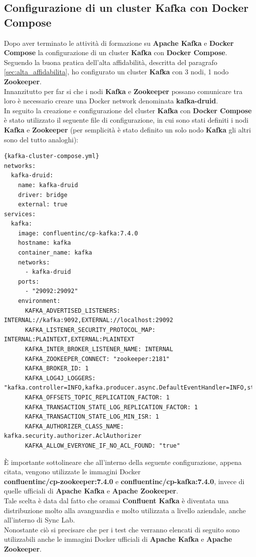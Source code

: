 \subsection{Configurazione di un cluster Kafka con Docker Compose}
Dopo aver terminato le attività di formazione su \textbf{Apache Kafka} e \textbf{Docker Compose} 
la configurazione di un \gls{cluster}{} \textbf{Kafka} con \textbf{Docker Compose}. 
\\Seguendo la buona pratica dell'alta affidabilità, descritta del 
paragrafo \ref{sec:alta_affidabilita}, ho configurato un \gls{cluster}{} \textbf{Kafka} con 3 nodi, 1 nodo \textbf{Zookeeper}.\\
Innanzitutto per far si che i nodi \textbf{Kafka} e \textbf{Zookeeper} possano comunicare tra loro è necessario creare una 
\gls{Docker network}{} denominata \textbf{kafka-druid}.\\
In seguito la creazione e configurazione del \gls{cluster}{} \textbf{Kafka} con \textbf{Docker Compose} è stato utilizzato il seguente file di 
configurazione, in cui sono stati definiti i nodi \textbf{Kafka} e \textbf{Zookeeper} (per semplicità è stato definito un solo nodo \textbf{Kafka} gli altri sono del tutto analoghi):
\begin{lstlisting}[caption=\texttt{kafka-cluster-compose.yml}, label=lst:file]{kafka-cluster-compose.yml}
networks:
  kafka-druid:
    name: kafka-druid
    driver: bridge
    external: true
services:
  kafka:
    image: confluentinc/cp-kafka:7.4.0
    hostname: kafka
    container_name: kafka
    networks:
      - kafka-druid
    ports:
      - "29092:29092"
    environment:
      KAFKA_ADVERTISED_LISTENERS: INTERNAL://kafka:9092,EXTERNAL://localhost:29092
      KAFKA_LISTENER_SECURITY_PROTOCOL_MAP: INTERNAL:PLAINTEXT,EXTERNAL:PLAINTEXT
      KAFKA_INTER_BROKER_LISTENER_NAME: INTERNAL
      KAFKA_ZOOKEEPER_CONNECT: "zookeeper:2181"
      KAFKA_BROKER_ID: 1
      KAFKA_LOG4J_LOGGERS: "kafka.controller=INFO,kafka.producer.async.DefaultEventHandler=INFO,state.change.logger=INFO"
      KAFKA_OFFSETS_TOPIC_REPLICATION_FACTOR: 1
      KAFKA_TRANSACTION_STATE_LOG_REPLICATION_FACTOR: 1
      KAFKA_TRANSACTION_STATE_LOG_MIN_ISR: 1
      KAFKA_AUTHORIZER_CLASS_NAME: kafka.security.authorizer.AclAuthorizer
      KAFKA_ALLOW_EVERYONE_IF_NO_ACL_FOUND: "true"

\end{lstlisting}
È importante sottolineare che all'interno della seguente configurazione, appena citata, vengono utilizzate le \gls{immagini Docker}{} \\\textbf{confluentinc/cp-zookeeper:7.4.0} e \textbf{confluentinc/cp-kafka:7.4.0}, invece 
di quelle ufficiali di \textbf{Apache Kafka} e \textbf{Apache Zookeeper}.\\
Tale scelta è data dal fatto che oramai \textbf{Confluent Kafka} è diventata una distribuzione molto alla avanguardia e molto utilizzata 
a livello aziendale, anche all'interno di Sync Lab.\\
Nonostante ciò si precisare che per i test che verranno elencati di seguito
sono utilizzabili anche le \gls{immagini Docker}{} ufficiali di \textbf{Apache Kafka} e \textbf{Apache Zookeeper}.\\
